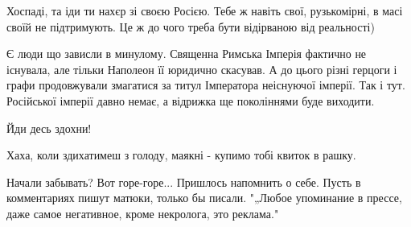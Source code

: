 \begin{itemize}
 

Хоспаді, та іди ти нахєр зі своєю Росією. Тебе ж навіть свої, рузькомірні, в
масі своїй не підтримують. Це ж до чого треба бути відірваною від реальності)

\begin{itemize}
 

Є люди що зависли в минулому. Священна Римська Імперія фактично не існувала,
але тільки Наполеон її юридично скасував. А до цього різні герцоги і графи
продовжували змагатися за титул Імператора неіснуючої імперії. Так і тут.
Російської імперії давно немає, а відрижка ще поколіннями буде виходити.

\end{itemize}


Йди десь здохни!

 
Хаха, коли здихатимеш з голоду, маякні - купимо тобі квиток в рашку.

 

Начали забывать? Вот горе-горе... Пришлось напомнить о себе. Пусть в
комментариях пишут матюки, только бы писали. "„Любое упоминание в прессе, даже
самое негативное, кроме некролога, это реклама."

\begin{itemize}
 


\end{itemize}
\end{itemize}
